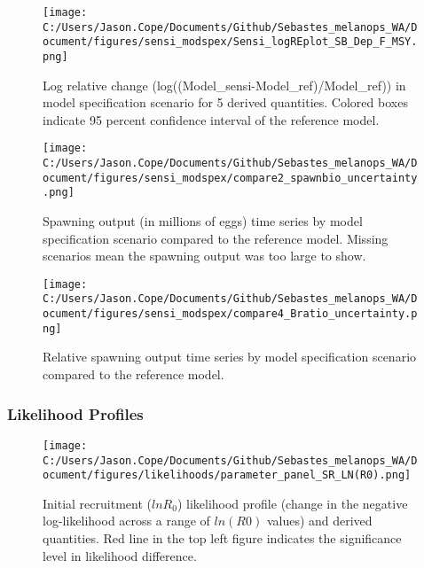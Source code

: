 \documentclass[11pt,
  english,
  letterpaper,
]{article}
\begin{document}
\pagebreak

\begin{figure}
\centering
\texttt{[image: C:/Users/Jason.Cope/Documents/Github/Sebastes\_melanops\_WA/Document/figures/sensi\_modspex/Sensi\_logREplot\_SB\_Dep\_F\_MSY.png]}
\caption{Log relative change (log((Model\_sensi-Model\_ref)/Model\_ref)) in model specification scenario for 5 derived quantities. Colored boxes indicate 95 percent confidence interval of the reference model.\label{fig:sensi-modspec-RE}}
\end{figure}

\pagebreak

\begin{figure}
\centering
\texttt{[image: C:/Users/Jason.Cope/Documents/Github/Sebastes\_melanops\_WA/Document/figures/sensi\_modspex/compare2\_spawnbio\_uncertainty.png]}
\caption{Spawning output (in millions of eggs) time series by model specification scenario compared to the reference model. Missing scenarios mean the spawning output was too large to show.\label{fig:sensi-modspec-ssb}}
\end{figure}

\pagebreak

\begin{figure}
\centering
\texttt{[image: C:/Users/Jason.Cope/Documents/Github/Sebastes\_melanops\_WA/Document/figures/sensi\_modspex/compare4\_Bratio\_uncertainty.png]}
\caption{Relative spawning output time series by model specification scenario compared to the reference model.\label{fig:sensi-modspec-depl}}
\end{figure}

\pagebreak

\hypertarget{likelihood-profiles-1}{%
\subsubsection{Likelihood Profiles}\label{likelihood-profiles-1}}

\begin{figure}
\centering
\texttt{[image: C:/Users/Jason.Cope/Documents/Github/Sebastes\_melanops\_WA/Document/figures/likelihoods/parameter\_panel\_SR\_LN(R0).png]}
\caption{Initial recruitment (\(lnR_0\)) likelihood profile (change in the negative log-likelihood across a range of \(ln(R0)\) values) and derived quantities. Red line in the top left figure indicates the significance level in likelihood difference.\label{fig:R0-profile}}
\end{figure}
\end{document}
